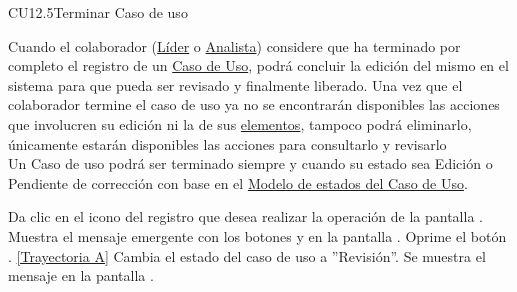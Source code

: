 	\begin{UseCase}{CU12.5}{Terminar Caso de uso}{
			
			Cuando el colaborador (\hyperlink{jefe}{Líder} o \hyperlink{analista}{Analista}) considere que ha terminado por completo el registro de un \hyperlink{casoUso}{Caso de Uso}, podrá concluir la edición del mismo en el sistema para que pueda ser revisado y finalmente liberado.
			Una vez que el colaborador termine el caso de uso ya no se encontrarán disponibles las acciones que involucren su edición ni la de sus \hyperlink{tElemento}{elementos}, tampoco podrá eliminarlo, únicamente estarán disponibles las acciones para consultarlo y revisarlo \\
		
			Un Caso de uso podrá ser terminado siempre y cuando su estado sea Edición o Pendiente de corrección con base en el \hyperlink{edoCU}{Modelo de estados del Caso de Uso}. 
			
	}
	\end{UseCase}
	\begin{UCtrayectoria}
		\UCpaso[\UCactor] Da clic en el icono  del registro que desea realizar la operación de la pantalla .
		\UCpaso[\UCsist] Muestra el mensaje emergente  con los botones  y  en la pantalla .
		\UCpaso[\UCactor] Oprime el botón . \hyperlink{CU12-5:TAA}{[Trayectoria A]}
		\UCpaso[\UCsist] Cambia el estado del caso de uso a ''Revisión''.
		\UCpaso[\UCactor] Se muestra el mensaje  en la pantalla .
	\end{UCtrayectoria}		

